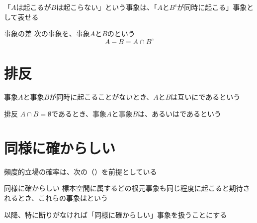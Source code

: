 \documentclass[../../../topic_probability-statistics]{subfiles}
\begin{document}
「$A$は起こるが$B$は起こらない」という事象は、「$A$と$B^c$が同時に起こる」事象として表せる

\begin{definition}{事象の差}
  次の事象を、事象$A$と$B$のという
  \begin{equation*}
    A - B = A \cap B^c
  \end{equation*}
\end{definition}

\sectionline
\section{排反}

事象$A$と事象$B$が同時に起こることがないとき、$A$と$B$は互いにであるという

\begin{definition}{排反}
  $A \cap B = \emptyset$であるとき、事象$A$と事象$B$は、あるいはであるという
\end{definition}

\sectionline
\section{同様に確からしい}

頻度的立場の確率は、次の（）を前提としている

\begin{definition}{同様に確からしい}
  標本空間に属するどの根元事象も同じ程度に起こると期待されるとき、これらの事象はという
\end{definition}

以降、特に断りがなければ「同様に確からしい」事象を扱うことにする
\end{document}
